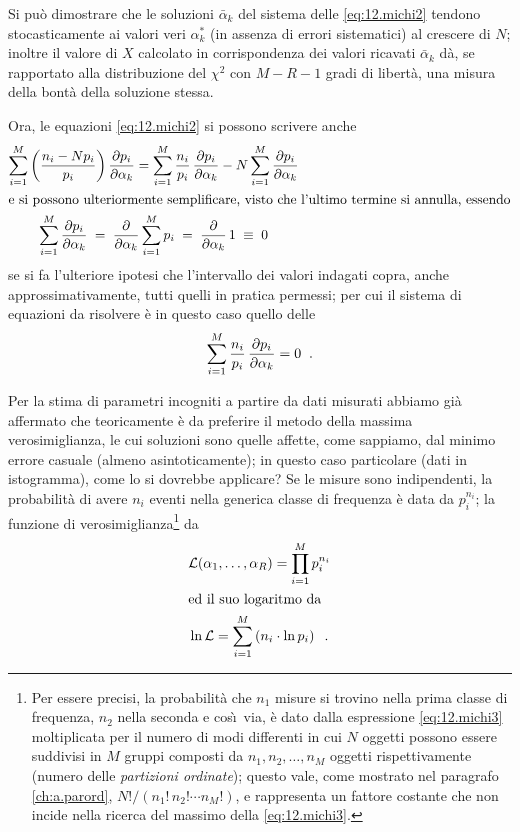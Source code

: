 Si pu\`o dimostrare che le soluzioni $\bar \alpha_k$ del
sistema delle \eqref{eq:12.michi2} tendono stocasticamente
ai valori veri $\alpha_k^*$ (in assenza di errori
sistematici) al crescere di $N$; inoltre il valore di $X$
calcolato in corrispondenza dei valori ricavati
$\bar \alpha_k$ d\`a, se rapportato alla distribuzione del
$\chi^2$ con $M - R - 1$ gradi di libert\`a, una misura
della bont\`a della soluzione stessa.

Ora, le equazioni \eqref{eq:12.michi2} si possono scrivere
anche
\begin{gather*}
  \sum_{i=1}^M \left( \frac{n_i - N p_i}{p_i} \right)
    \frac{\partial p_i}{\partial \alpha_k} =
    \sum_{i=1}^M \frac{n_i}{p_i} \, \frac{\partial
    p_i}{\partial \alpha_k} - N \sum_{i=1}^M
    \frac{\partial p_i}{\partial \alpha_k} \\
  \intertext{e si possono ulteriormente semplificare,
    visto che l'ultimo termine si annulla, essendo}
  \sum_{i=1}^M \frac{\partial p_i}{\partial \alpha_k}
    \; = \; \frac{\partial}{\partial \alpha_k}
    \sum_{i=1}^M p_i \; = \; \frac{\partial}{\partial
    \alpha_k} \, 1 \; \equiv \; 0
\end{gather*}
se si fa l'ulteriore ipotesi che l'intervallo dei valori
indagati copra, anche approssimativamente, tutti quelli in
pratica permessi; per cui il sistema di equazioni da
risolvere \`e in questo caso quello delle
\begin{equation} \label{eq:12.michi4}
  \sum_{i=1}^M \frac{n_i}{p_i} \, \frac{\partial
    p_i}{\partial \alpha_k} = 0 \;\; .
\end{equation}

%
Per la stima di parametri incogniti a partire da dati
misurati abbiamo gi\`a affermato che teoricamente \`e da
preferire il metodo della massima verosimiglianza, le cui
soluzioni sono quelle affette, come sappiamo, dal minimo
errore casuale (almeno asintoticamente); in questo caso
particolare (dati in istogramma), come lo si dovrebbe
applicare?  Se le misure sono indipendenti, la probabilit\`a
di avere $n_i$ eventi nella generica classe di frequenza \`e
data da $p_i^{n_i}$; la funzione di
verosimiglianza\/\footnote{Per essere precisi, la
  probabilit\`a che $n_1$ misure si trovino nella prima
  classe di frequenza, $n_2$ nella seconda e cos\`\i\ via,
  \`e dato dalla espressione \eqref{eq:12.michi3}
  moltiplicata per il numero di modi differenti in cui $N$
  oggetti possono essere suddivisi in $M$ gruppi composti da
  $n_1, n_2,\ldots,n_M$ oggetti rispettivamente (numero
  delle \emph{partizioni ordinate});%
  questo vale, come mostrato nel paragrafo
  \ref{ch:a.parord}, $N! / (n_1!\, n_2!\cdots n_M!)$, e
  rappresenta un fattore costante che non incide nella
  ricerca del massimo della \eqref{eq:12.michi3}.}  da
\begin{gather}
  \mathcal{L}(\alpha_1,\ldots,\alpha_R) = \prod_{i=1}^M
    p_i^{n_i} \label{eq:12.michi3} \\
  \intertext{ed il suo logaritmo da}
  \ln \mathcal{L} = \sum_{i=1}^M \left( n_i \cdot \ln
    p_i \right) \peq . \notag
\end{gather}

